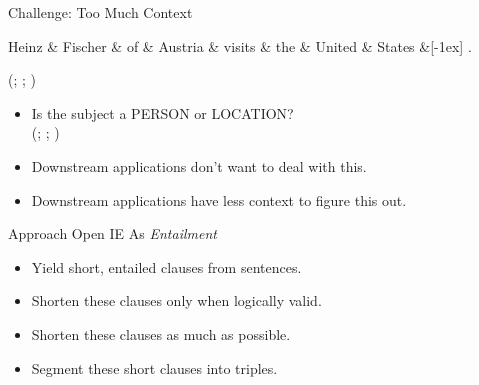 \def\title{Challenge: Too Much Context}
\begin{frame}{\title}
\begin{center}
  \begin{dependency}[text only label, label style={above}]
    \begin{deptext}[column sep=-0.00cm]
      Heinz \& Fischer \& of \& Austria \& visits \& the \& United \& States \&[-1ex] . \\
    \end{deptext}
  \end{dependency}

  (; ; )
\end{center}

\pause
\begin{itemize}
  \item Is the subject a PERSON or LOCATION? \\
        (; ; )
  \pause
  \item Downstream applications don't want to deal with this.
  \item Downstream applications have less context to figure this out.
\end{itemize}
\end{frame}


\def\title{Approach Open IE As \textit{Entailment}}
\begin{frame}{\title}
\begin{itemize}
  \item Yield short, entailed clauses from sentences.
\end{itemize}
\vspace{0.5em}
\pause

\begin{itemize}
  \item Shorten these clauses only when logically valid.
\end{itemize}
\vspace{0.5em}
\pause

\begin{itemize}
  \item Shorten these clauses as much as possible.
\end{itemize}
\vspace{0.5em}
\pause

\begin{itemize}
  \item Segment these short clauses into triples.
\end{itemize}
\end{frame}

